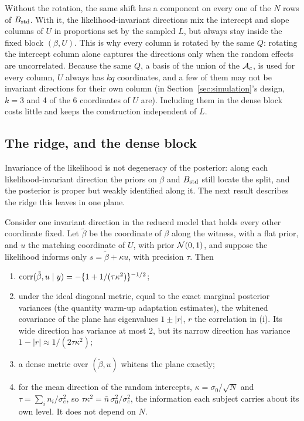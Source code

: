 Without the rotation, the same shift has a component on every one of the
$N$ rows of $B_{\mathrm{std}}$. With it, the likelihood-invariant directions mix
the intercept and slope columns of $U$ in proportions set by the sampled
$L$, but always stay inside the fixed block $(\beta, U)$. This is why every
column is rotated by the same $Q$: rotating the intercept column alone
captures the directions only when the random effects are uncorrelated.
Because the same $Q$, a basis of the union of the $\mathcal{A}_c$, is used for every
column, $U$ always has $kq$ coordinates, and a few of them may not be
invariant directions for their own column (in Section~\ref{sec:simulation}'s
design, $k = 3$ and 4 of the 6 coordinates of $U$ are). Including them in
the dense block costs little and keeps the construction independent of
$L$.

\subsection{The ridge, and the dense block}

Invariance of the likelihood is not degeneracy of the posterior: along
each likelihood-invariant direction the priors on $\beta$ and $B_{\mathrm{std}}$ still
locate the split, and the posterior is proper but weakly identified along
it. The next result describes the ridge this leaves in one plane.

\begin{proposition}\label{prop:ridge}
Consider one invariant direction in the reduced model that holds every
other coordinate fixed. Let $\tilde\beta$ be the coordinate of $\beta$ along
the witness, with a flat prior, and $u$ the matching coordinate of $U$,
with prior $\mathcal{N}(0,1)$, and suppose the likelihood informs only $s =
\tilde\beta + \kappa u$, with precision $\tau$. Then
\begin{enumerate}
\item[(i)] $\operatorname{corr}(\tilde\beta, u \mid y) = -\{1 + 1/(\tau\kappa^2)\}^{-1/2}$;
\item[(ii)] under the ideal diagonal metric, equal to the exact marginal
posterior variances (the quantity warm-up adaptation estimates), the
whitened covariance of the plane has eigenvalues $1 \pm |r|$, $r$ the
correlation in (i). Its wide direction has variance at most 2, but its
narrow direction has variance $1 - |r| \approx 1/(2\tau\kappa^2)$;
\item[(iii)] a dense metric over $(\tilde\beta, u)$ whitens the plane
exactly;
\item[(iv)] for the mean direction of the random intercepts, $\kappa =
\sigma_0/\sqrt{N}$ and $\tau = \sum_i n_i/\sigma_e^2$, so $\tau\kappa^2 =
\bar n\,\sigma_0^2/\sigma_e^2$, the information each subject carries about
its own level. It does not depend on $N$.
\end{enumerate}
\end{proposition}

